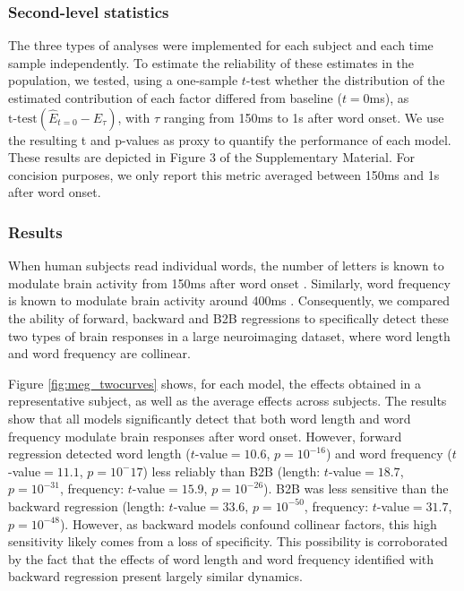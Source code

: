 \subsubsection{Second-level statistics}

The three types of analyses were implemented for each subject and each time
sample independently. To estimate the reliability of these estimates in the
population, we tested, using a one-sample $t$-test whether the distribution of
the estimated contribution of each factor differed from baseline ($t=0$ms),
as $\text{t-test}(\hat E_{t=0} - \hat E_{\tau})$, with $\tau$ ranging from
150ms to 1s after word onset. We use the resulting t and p-values as proxy to
quantify the performance of each model. These results are depicted in Figure
3 of the Supplementary Material. For concision purposes, we only report this metric averaged
between 150ms and 1s after word onset.

\subsubsection{Results}
When human subjects read individual words, the number of letters is known to modulate
brain activity from 150ms after word onset \citep{pegado2014timing}.
Similarly, word frequency is known to modulate brain activity around 400ms
\citep{kutas2011thirty}. Consequently, we compared the ability of forward, backward and B2B regressions to specifically detect these two types of brain responses in a large neuroimaging dataset, where word length and word frequency are collinear.

Figure \ref{fig:meg_twocurves} shows, for each model, the effects obtained
in a representative subject, as well as the average effects across subjects.
The results show that all models significantly detect that both word length and
word frequency modulate brain responses after word onset. However,
forward regression detected word length ($t$-value$=10.6$, $p=10^{-16}$) and
word frequency ($t$-value$=11.1$, $p=10^-17$) less reliably than B2B (length:
$t$-value$=18.7$, $p=10^{-31}$, frequency: $t$-value$=15.9$, $p=10^{-26}$). B2B
was less sensitive than the backward regression (length: $t$-value$=33.6$,
$p=10^{-50}$, frequency: $t$-value$=31.7$, $p=10^{-48}$). However, as backward models confound collinear factors, this high sensitivity likely comes from a loss of specificity. This possibility is corroborated by the fact that the effects of word length and word frequency identified with backward regression present largely similar dynamics.

